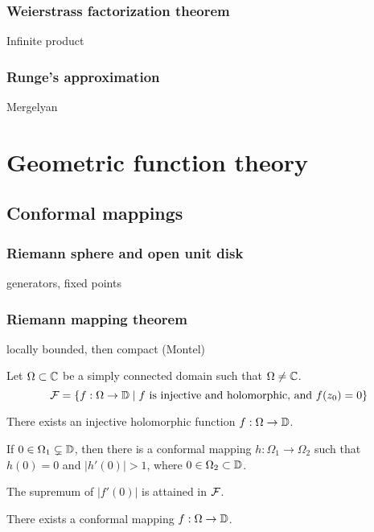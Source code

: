 \documentclass{../note}
\begin{document}
\section{Weierstrass factorization theorem}
Infinite product

\section{Runge's approximation}
Mergelyan









\part{Geometric function theory}

\chapter{Conformal mappings}
\section{Riemann sphere and open unit disk}
\begin{prb}
\end{prb}
\begin{prb}
generators,
fixed points
\end{prb}
\begin{prb}
\end{prb}

\section{Riemann mapping theorem}


\begin{prb}
locally bounded, then compact (Montel)
\end{prb}

\begin{prb}
\end{prb}

\begin{prb}
Let $\Omega\subset\mathbb{C}$ be a simply connected domain such that $\Omega\ne\mathbb{C}$.
\[\mathcal{F}=\{f:\Omega\to\mathbb{D}\mid f\text{ is injective and holomorphic, and }f(z_0)=0\}\]
\begin{parts}
\item There exists an injective holomorphic function $f:\Omega\to\mathbb{D}$.
\item If $0\in\Omega_1\subsetneq\mathbb{D}$, then there is a conformal mapping $h:\Omega_1\to\Omega_2$ such that $h(0)=0$ and $|h'(0)|>1$, where $0\in\Omega_2\subset\mathbb{D}$.
\item The supremum of $|f'(0)|$ is attained in $\mathcal{F}$.
\item There exists a conformal mapping $f:\Omega\to\mathbb{D}$.
\end{parts}
\end{prb}
\end{document}
